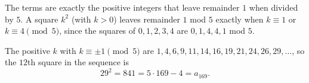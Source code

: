 The terms are exactly the positive integers that leave remainder $1$ when divided by $5$. A square $k^2$ (with $k>0$) leaves remainder $1$ mod $5$ exactly when $k\equiv1$ or $k\equiv4\pmod5$, since the squares of $0,1,2,3,4$ are $0,1,4,4,1$ mod $5$.

The positive $k$ with $k\equiv\pm1\pmod5$ are $1,4,6,9,11,14,16,19,21,24,26,29,\dots$, so the $12$th square in the sequence is
\[29^2=\boxed{841}=5\cdot169-4=a_{169}.\]
